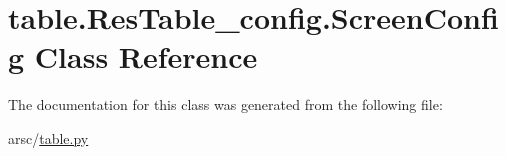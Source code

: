 \hypertarget{classtable_1_1ResTable__config_1_1ScreenConfig}{}\section{table.\+Res\+Table\+\_\+config.\+Screen\+Config Class Reference}
\label{classtable_1_1ResTable__config_1_1ScreenConfig}


The documentation for this class was generated from the following file\+:\begin{DoxyCompactItemize}
\item 
arsc/\mbox{\hyperlink{table_8py}{table.\+py}}\end{DoxyCompactItemize}
